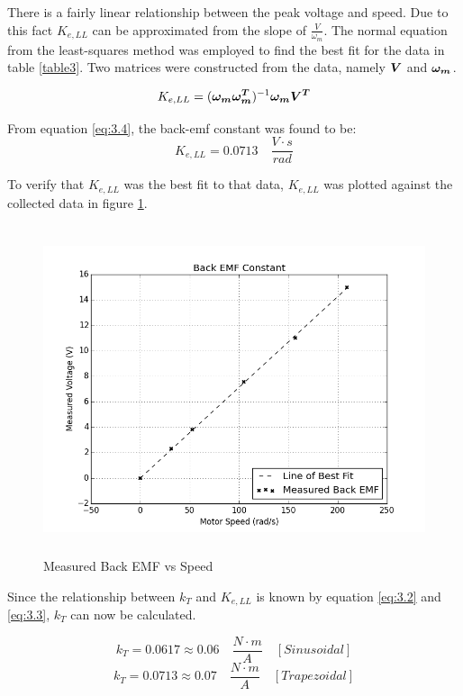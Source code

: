 There is a fairly linear relationship between the peak voltage and speed. Due to this fact \(K_{e,LL}\) can be approximated from the slope of \(\frac{V}{\omega_m}\). The normal equation from the least-squares method was employed to find the best fit for the data in table \ref{table3}. Two matrices were constructed from the data, namely \(\bm{V}\) and \(\bm{\omega_m}\).

\begin{equation} \label{eq:3.4}
K_{e,LL} = (\bm{\omega_m \omega_m^T})^{-1} \bm{\omega_m V^T}
\end{equation} 

From equation \ref{eq:3.4}, the back-emf constant was found to be: 
\[K_{e,LL} = 0.0713 \quad \frac{V \cdot s}{rad} \]

To verify that \(K_{e,LL}\) was the best fit to that data, \(K_{e,LL}\) was plotted against the collected data in figure \ref{back_emf_plot}.

\begin{figure}[H]%
	\begin{center}
		\includegraphics[height=3.8in]{figures/back_emf_plot.png}
		
		\caption[Measured Back EMF vs Speed]{Measured Back EMF vs Speed}
		
		\label{back_emf_plot}
	\end{center}
\end{figure}

Since the relationship between \(k_T\) and \(K_{e,LL}\) is known by equation \ref{eq:3.2} and \ref{eq:3.3}, \(k_T\) can now be calculated.
\begin{tcolorbox}[
    standard jigsaw,
    opacityback=0]
\[k_T = 0.0617 \approx 0.06 \quad \frac{N \cdot m}{A} \quad [Sinusoidal]\]
\[k_T =  0.0713 \approx 0.07 \quad  \frac{N \cdot m}{A} \quad [Trapezoidal]\]
\end{tcolorbox}

